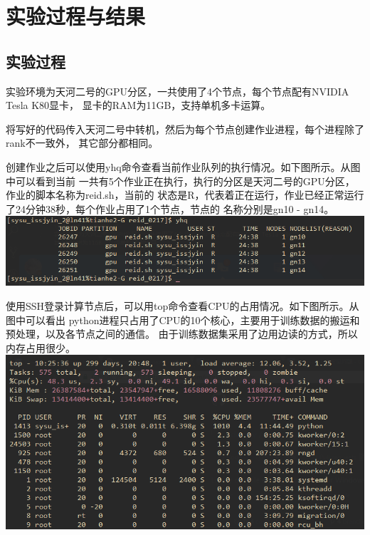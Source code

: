 \section{实验过程与结果}
\subsection{实验过程}
实验环境为天河二号的GPU分区，一共使用了4个节点，每个节点配有NVIDIA Tesla K80显卡，
显卡的RAM为11GB，支持单机多卡运算。

将写好的代码传入天河二号中转机，然后为每个节点创建作业进程，每个进程除了rank不一致外，
其它部分都相同。

创建作业之后可以使用yhq命令查看当前作业队列的执行情况。如下图所示。从图中可以看到当前
一共有5个作业正在执行，执行的分区是天河二号的GPU分区，作业的脚本名称为reid.sh，当前的
状态是R，代表着正在运行，作业已经正常运行了24分钟38秒，每个作业占用了1个节点，节点的
名称分别是gn10 - gn14。\\[0.5cm]
\includegraphics[width=1\textwidth]{figure/yhq}

使用SSH登录计算节点后，可以用top命令查看CPU的占用情况。如下图所示。从图中可以看出
python进程只占用了CPU的10个核心，主要用于训练数据的搬运和预处理，以及各节点之间的通信。
由于训练数据集采用了边用边读的方式，所以内存占用很少。\\[0.5cm]
\includegraphics[width=1\textwidth]{figure/top}

